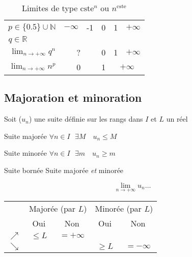 \documentclass{article}
\newcommand{\R}{\mathds{R}}
\newcommand{\N}{\mathds{N}}
\newcommand{\oo}{\infty}
\newcommand{\twoCols}[1]{\multicolumn{2}{c|}{#1}}
\newcommand{\twoColsNB}[1]{\multicolumn{2}{c}{#1}}
\newcommand{ \const}{\text{cste}}
\newenvironment{descriptiona}{\begin{description}[leftmargin=!,labelwidth=\widthof{\bfseries The longest label}]}{\end{description}}
\begin{document}
\begin{minipage}{\textwidth}

\begin{table}[H]
    \centering
    \begin{tabular}{r||l|c|c|c|l}
         $p \in \{0.5\}\cup\N$            & $-\infty$ & -1 & 0 & 1 & $+\infty$  \\
         $q \in \R\quad\quad\quad\;\:$ & & & & \\\hline\hline
        $\displaystyle\lim_{n\to+\infty} q^n$ & \twoCols{?} & 0 & 1 & $+\infty$ \\\hline
        $\displaystyle\lim_{n\to+\infty} n^p$ & \twoCols{0} & 1 & \twoColsNB{$+\infty$}
    \end{tabular}
    \caption*{Limites de type $\const^n$ ou $n^\const$}
    \label{tab:my_label}
\end{table}


\end{minipage}

\subsection{Majoration et minoration}

Soit ($u_n$) une suite définie sur les rangs dans $I$ et $L$ un réel
\begin{descriptiona}
\item[Suite majorée] $\forall n \in I \:\:\: \exists M \quad u_n \leq M$
\item[Suite minorée] $\forall n \in I \:\:\: \exists m \quad u_n \geq m$
\item[Suite bornée] Suite majorée \textit{et} minorée
\end{descriptiona}

\[\lim_{n\to+\oo} u_n \dots\]

\begin{table}[H]
    \centering
    \begin{tabular}{c|cccc}
                & \multicolumn{2}{c}{Majorée (par $L$)}   & \multicolumn{2}{c}{Minorée (par $L$)}    \\
                & Oui               & Non                 & Oui                 & Non                \\
                \hline
    $\nearrow$  & $\leq L$          & $= +\oo$            &                     &                    \\
    $\searrow$  &                   &                     & $\geq L$            & $=-\oo$
    \end{tabular}
\end{table}
\end{document}
